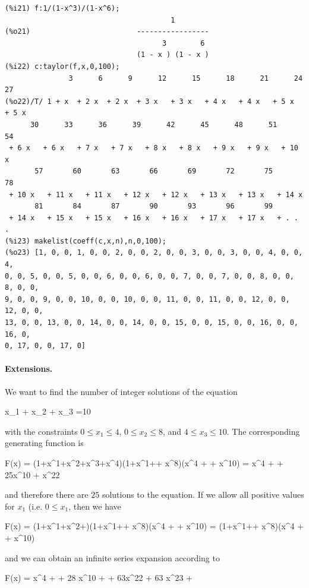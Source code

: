 \begin{verbatim}
(%i21) f:1/(1-x^3)/(1-x^6);
                                       1
(%o21)                         -----------------
                                     3        6
                               (1 - x ) (1 - x )
(%i22) c:taylor(f,x,0,100);
               3      6      9      12      15      18      21      24      27
(%o22)/T/ 1 + x  + 2 x  + 2 x  + 3 x   + 3 x   + 4 x   + 4 x   + 5 x   + 5 x
      30      33      36      39      42      45      48      51       54
 + 6 x   + 6 x   + 7 x   + 7 x   + 8 x   + 8 x   + 9 x   + 9 x   + 10 x
       57       60       63       66       69       72       75       78
 + 10 x   + 11 x   + 11 x   + 12 x   + 12 x   + 13 x   + 13 x   + 14 x
       81       84       87       90       93       96       99
 + 14 x   + 15 x   + 15 x   + 16 x   + 16 x   + 17 x   + 17 x   + . . .
(%i23) makelist(coeff(c,x,n),n,0,100);
(%o23) [1, 0, 0, 1, 0, 0, 2, 0, 0, 2, 0, 0, 3, 0, 0, 3, 0, 0, 4, 0, 0, 4, 
0, 0, 5, 0, 0, 5, 0, 0, 6, 0, 0, 6, 0, 0, 7, 0, 0, 7, 0, 0, 8, 0, 0, 8, 0, 0, 
9, 0, 0, 9, 0, 0, 10, 0, 0, 10, 0, 0, 11, 0, 0, 11, 0, 0, 12, 0, 0, 12, 0, 0, 
13, 0, 0, 13, 0, 0, 14, 0, 0, 14, 0, 0, 15, 0, 0, 15, 0, 0, 16, 0, 0, 16, 0, 
0, 17, 0, 0, 17, 0]
\end{verbatim}

\paragraph{Extensions.} We want to find the number of integer solutions of the equation

\bee
x_1 + x_2 + x_3 =10
\eee

with the constraints $0 \leq x_1 \leq 4$, $0 \leq x_2 \leq 8$, and $4 \leq x_3 \leq 10$. The corresponding generating function is

\bee
F(x) = (1+x^1+x^2+x^3+x^4)(1+x^1+\cdots + x^8)(x^4 + \cdots + x^{10}) = x^4 + \cdots + 25x^{10} + \cdots x^{22}
\eee

and therefore there are $25$ solutions to the equation. If we allow all positive values for $x_1$ (i.e. $0 \leq x_1$, then we have

\bee
F(x) = (1+x^1+x^2+\cdots)(1+x^1+\cdots + x^8)(x^4 + \cdots + x^{10}) = (1+x^1+\cdots + x^8)(x^4 + \cdots + x^{10})
\eee

and we can obtain an infinite series expansion according to

\bee
F(x) = x^4 + \cdots + 28 x^{10} + \cdots + 63x^{22} + 63 x^{23} + \cdots
\eee

